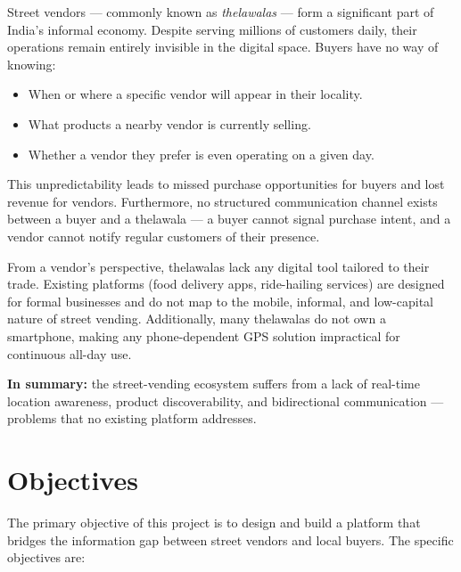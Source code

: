 \documentclass[12pt, a4paper]{article}
\begin{document}
Street vendors --- commonly known as \textit{thelawalas} --- form a significant part of India's informal economy. Despite serving millions of customers daily, their operations remain entirely invisible in the digital space. Buyers have no way of knowing:

\begin{itemize}[noitemsep]
    \item When or where a specific vendor will appear in their locality.
    \item What products a nearby vendor is currently selling.
    \item Whether a vendor they prefer is even operating on a given day.
\end{itemize}

This unpredictability leads to missed purchase opportunities for buyers and lost revenue for vendors. Furthermore, no structured communication channel exists between a buyer and a thelawala --- a buyer cannot signal purchase intent, and a vendor cannot notify regular customers of their presence.

From a vendor's perspective, thelawalas lack any digital tool tailored to their trade. Existing platforms (food delivery apps, ride-hailing services) are designed for formal businesses and do not map to the mobile, informal, and low-capital nature of street vending. Additionally, many thelawalas do not own a smartphone, making any phone-dependent GPS solution impractical for continuous all-day use.

\textbf{In summary:} the street-vending ecosystem suffers from a lack of real-time location awareness, product discoverability, and bidirectional communication --- problems that no existing platform addresses.

\section{Objectives}

The primary objective of this project is to design and build a platform that bridges the information gap between street vendors and local buyers. The specific objectives are:
\end{document}
